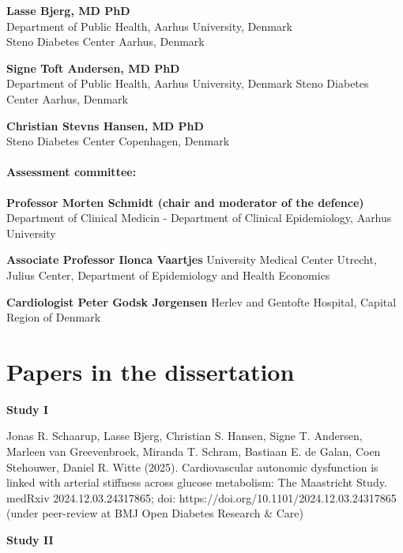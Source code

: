 \documentclass[
  a4paper,
  headsepline=true,
  open=any]{scrbook}
\begin{document}
\textbf{Lasse Bjerg, MD PhD}\\
Department of Public Health, Aarhus University, Denmark\\
Steno Diabetes Center Aarhus, Denmark

\textbf{Signe Toft Andersen, MD PhD}\\
Department of Public Health, Aarhus University, Denmark Steno Diabetes
Center Aarhus, Denmark

\textbf{Christian Stevns Hansen, MD PhD}\\
Steno Diabetes Center Copenhagen, Denmark

\hypertarget{assessment-committee}{%
\subsubsection*{Assessment committee:}\label{assessment-committee}}

\textbf{Professor Morten Schmidt (chair and moderator of the defence)}
Department of Clinical Medicin - Department of Clinical Epidemiology,
Aarhus University

\textbf{Associate Professor Ilonca Vaartjes} University Medical Center
Utrecht, Julius Center, Department of Epidemiology and Health Economics

\textbf{Cardiologist Peter Godsk Jørgensen} Herlev and Gentofte
Hospital, Capital Region of Denmark


\hypertarget{sec-linked-papers}{%
\chapter*{Papers in the dissertation}\label{sec-linked-papers}}


\textbf{Study I}

Jonas R. Schaarup, Lasse Bjerg, Christian S. Hansen, Signe T. Andersen,
Marleen van Greevenbroek, Miranda T. Schram, Bastiaan E. de Galan, Coen
Stehouwer, Daniel R. Witte (2025). Cardiovascular autonomic dysfunction
is linked with arterial stiffness across glucose metabolism: The
Maastricht Study. medRxiv 2024.12.03.24317865; doi:
https://doi.org/10.1101/2024.12.03.24317865 (under peer-review at BMJ
Open Diabetes Research \& Care)

\textbf{Study II}
\end{document}
